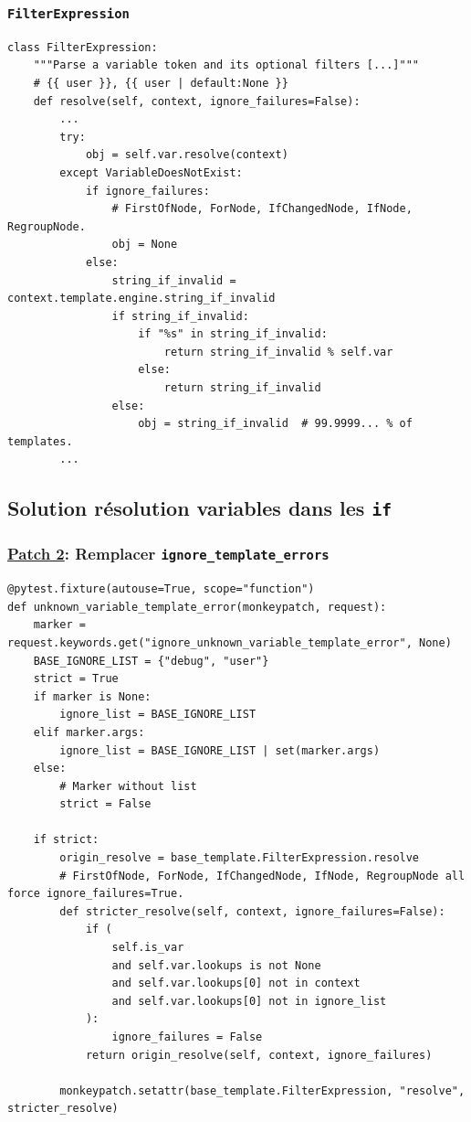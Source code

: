 \documentclass{beamer}
\begin{document}
\begin{frame}[fragile]
    \frametitle{\texttt{FilterExpression}}

    \begin{verbatim}
class FilterExpression:
    """Parse a variable token and its optional filters [...]"""
    # {{ user }}, {{ user | default:None }}
    def resolve(self, context, ignore_failures=False):
        ...
        try:
            obj = self.var.resolve(context)
        except VariableDoesNotExist:
            if ignore_failures:
                # FirstOfNode, ForNode, IfChangedNode, IfNode, RegroupNode.
                obj = None
            else:
                string_if_invalid = context.template.engine.string_if_invalid
                if string_if_invalid:
                    if "%s" in string_if_invalid:
                        return string_if_invalid % self.var
                    else:
                        return string_if_invalid
                else:
                    obj = string_if_invalid  # 99.9999... % of templates.
        ...
    \end{verbatim}
\end{frame}

\subsection*{Solution résolution variables dans les \texttt{if}}

\begin{frame}[fragile]
    \frametitle{\href{https://github.com/gip-inclusion/les-emplois/blob/2ccc5db10f07c6049c66a96f5fe57ad6715bdc91/tests/conftest.py\#L320-L350}{Patch 2}: Remplacer \texttt{ignore\_template\_errors}}

    \begin{verbatim}
@pytest.fixture(autouse=True, scope="function")
def unknown_variable_template_error(monkeypatch, request):
    marker = request.keywords.get("ignore_unknown_variable_template_error", None)
    BASE_IGNORE_LIST = {"debug", "user"}
    strict = True
    if marker is None:
        ignore_list = BASE_IGNORE_LIST
    elif marker.args:
        ignore_list = BASE_IGNORE_LIST | set(marker.args)
    else:
        # Marker without list
        strict = False

    if strict:
        origin_resolve = base_template.FilterExpression.resolve
        # FirstOfNode, ForNode, IfChangedNode, IfNode, RegroupNode all force ignore_failures=True.
        def stricter_resolve(self, context, ignore_failures=False):
            if (
                self.is_var
                and self.var.lookups is not None
                and self.var.lookups[0] not in context
                and self.var.lookups[0] not in ignore_list
            ):
                ignore_failures = False
            return origin_resolve(self, context, ignore_failures)

        monkeypatch.setattr(base_template.FilterExpression, "resolve", stricter_resolve)
    \end{verbatim}
\end{frame}
\end{document}
